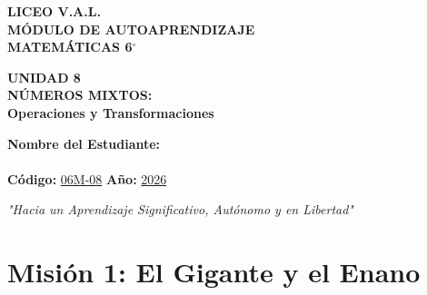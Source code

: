 \documentclass[12pt, letterpaper]{article}
\newcommand{\titulounidad}[2]{
	\begin{tcolorbox}[colback=valblue!10, colframe=valblue, arc=3mm, boxrule=1.5pt]
		\centering \Huge \textbf{UNIDAD #1}\\[0.2cm]
		\Large \textbf{#2}
	\end{tcolorbox}
	\vspace{0.5cm}
}
\begin{document}
	
	\begin{center}
		\vspace*{1cm}
		{\Huge \textbf{LICEO V.A.L.}}\\[0.5cm]
		{\LARGE \textbf{MÓDULO DE AUTOAPRENDIZAJE}}\\[0.5cm]
		{\Large \textbf{MATEMÁTICAS 6$^\circ$}}\\[0.5cm]
		
		\titulounidad{8}{NÚMEROS MIXTOS:\\ Operaciones y Transformaciones}
		
		\vspace{0.6cm}
		\begin{tcolorbox}[colback=white, colframe=valblue, width=12cm, arc=3mm, boxrule=1.5pt]
			\centering
			\vspace{0.3cm}
			\textbf{Nombre del Estudiante:}\\[0.3cm]
			\underline{\hspace{9cm}}\\[0.5cm]
			\textbf{Código:} \underline{06M-08} \hspace{1cm} \textbf{Año:} \underline{2026}
			\vspace{0.3cm}
		\end{tcolorbox}
		
		\vspace{0.8cm}
		\textit{"Hacia un Aprendizaje Significativo, Autónomo y en Libertad"}
		
	\end{center}
	
	
	\section*{Misión 1: El Gigante y el Enano}
	
\end{document}
